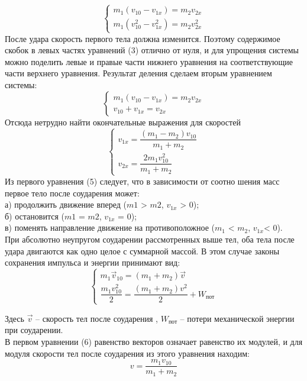 \documentclass[a4paper]{article}
\begin{document}
\begin{equation}
	\begin{cases}
		m_1(v_{10}-v_{1x})=m_2v_{2x}\\
		m_1(v^2_{10}-v^2_{1x})=m_2v^2_{2x}
	\end{cases}
\end{equation}
После удара скорость первого тела должна изменится. Поэтому
содержимое скобок в левых частях уравнений (3) отлично от нуля,
и для упрощения системы можно поделить левые и правые части
нижнего уравнения на соответствующие части верхнего уравнения.
Результат деления сделаем вторым уравнением системы:
\begin{equation}
	\begin{cases}
		m_1(v_{10}-v_{1x})=m_2v_{2x}\\
		v_{10}+v_{1x}=v_{2x}
	\end{cases}
\end{equation}
Отсюда нетрудно найти окончательные выражения для скоростей
\begin{equation}
	\begin{cases}
		v_{1x}=\dfrac{(m_1-m_2)v_{10}}{m_1+m_2}\\
		v_{2x}=\dfrac{2m_1v^2_{10}}{m_1+m_2}
	\end{cases}
\end{equation}
Из первого уравнения (5) следует, что в зависимости от соотно
шения масс первое тело после соударения может:\\
а) продолжить движение вперед ($m1$ > $m2$, $v_{1x}$ > 0);\\
б) остановится ($m1$ = $m2$, $v_{1x}$ = 0);\\
в) поменять направление движение на противоположное ($m_1$ <
$m_2$, $v_{1x}$< 0).\\
При абсолютно неупругом соударении рассмотренных выше тел,
оба тела после удара двигаются как одно целое с суммарной массой.
В этом случае законы сохранения импульса и энергии принимают
вид:
\begin{equation}
	\begin{cases}
		m_1\vec v_{10}=(m_1+m_2)\vec v\\
		\dfrac{m_1 v^2_{10}}{2}=\dfrac{(m_1+m_2) v^2}{2}+W_{\text{пот}}
	\end{cases}
\end{equation}

Здесь $\vec v$ – скорость тел после соударения , $W_{\text{пот}}$ – потери механической энергии при соударении.\\
В первом уравнении (6) равенство векторов означает равенство
их модулей, и для модуля скорости тел после соударения из этого
уравнения находим:
\begin{equation}
	v=\dfrac{m_1v_{10}}{m_1+m_2}
\end{equation}
\end{document}

